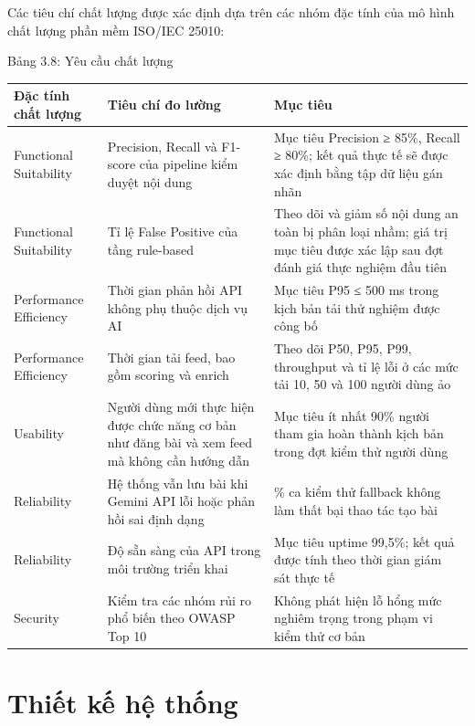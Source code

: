 Các tiêu chí chất lượng được xác định dựa trên các nhóm đặc tính của mô
hình chất lượng phần mềm ISO/IEC 25010:

Bảng 3.8: Yêu cầu chất lượng

{\def\LTcaptype{none} %
\begin{longtable}{
  |>{\centering\arraybackslash}p{}
  |>{\centering\arraybackslash}p{}
  |>{\centering\arraybackslash}p{}|}
\endhead
\hline
\endlastfoot
Đặc tính chất lượng & Tiêu chí đo lường & Mục tiêu \\ \hline
Functional Suitability & Precision, Recall và F1-score của pipeline
kiểm duyệt nội dung & Mục tiêu Precision ≥ 85\%, Recall ≥ 80\%; kết quả
thực tế sẽ được xác định bằng tập dữ liệu gán nhãn \\ \hline
Functional Suitability & Tỉ lệ False Positive của tầng rule-based &
Theo dõi và giảm số nội dung an toàn bị phân loại nhầm; giá trị mục tiêu
được xác lập sau đợt đánh giá thực nghiệm đầu tiên \\ \hline
Performance Efficiency & Thời gian phản hồi API không phụ thuộc dịch vụ
AI & Mục tiêu P95 ≤ 500 ms trong kịch bản tải thử nghiệm được công bố \\ \hline
Performance Efficiency & Thời gian tải feed, bao gồm scoring và enrich &
Theo dõi P50, P95, P99, throughput và tỉ lệ lỗi ở các mức tải 10, 50 và
100 người dùng ảo \\ \hline
Usability & Người dùng mới thực hiện được chức năng cơ bản như đăng bài
và xem feed mà không cần hướng dẫn & Mục tiêu ít nhất 90\% người tham gia
hoàn thành kịch bản trong đợt kiểm thử người dùng \\ \hline
Reliability & Hệ thống vẫn lưu bài khi Gemini API lỗi hoặc phản hồi sai
định dạng & 100\% ca kiểm thử fallback không làm thất bại thao tác tạo
bài \\ \hline
Reliability & Độ sẵn sàng của API trong môi trường triển khai & Mục tiêu
uptime 99,5\%; kết quả được tính theo thời gian giám sát thực tế \\ \hline
Security & Kiểm tra các nhóm rủi ro phổ biến theo OWASP Top 10 & Không
phát hiện lỗ hổng mức nghiêm trọng trong phạm vi kiểm thử cơ bản \\ \hline
\end{longtable}
}

\section{Thiết kế hệ thống}

